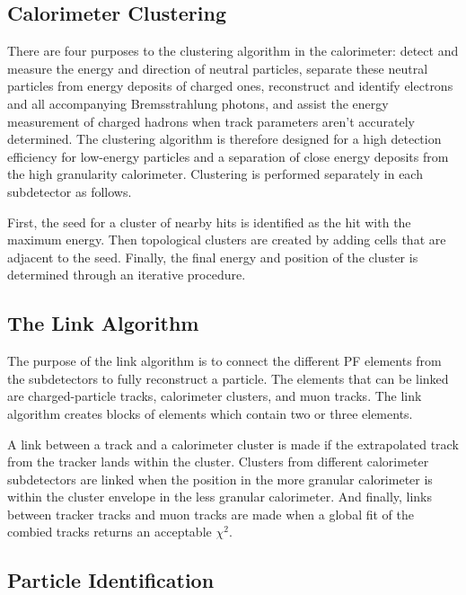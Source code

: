 \subsection{Calorimeter Clustering}

There are four purposes to the clustering algorithm in the calorimeter: detect and measure the energy and direction of neutral particles, separate these neutral particles from energy deposits of charged ones, reconstruct and identify electrons and all accompanying Bremsstrahlung photons, and assist the energy measurement of charged hadrons when track parameters aren’t accurately determined. The clustering algorithm is therefore designed for a high detection efficiency for low-energy particles and a separation of close energy deposits from the high granularity calorimeter. Clustering is performed separately in each subdetector as follows.

First, the seed for a cluster of nearby hits is identified as the hit with the maximum energy. Then topological clusters are created by adding cells that are adjacent to the seed. Finally, the final energy and position of the cluster is determined through an iterative procedure. 

\subsection{The Link Algorithm}

The purpose of the link algorithm is to connect the different PF elements from the subdetectors to fully reconstruct a particle. The elements that can be linked are charged-particle tracks, calorimeter clusters, and muon tracks. The link algorithm creates blocks of elements which contain two or three elements. 

A link between a track and a calorimeter cluster is made if the extrapolated track from the tracker lands within the cluster. Clusters from different calorimeter subdetectors are linked when the position in the more granular calorimeter is within the cluster envelope in the less granular calorimeter. And finally, links between tracker tracks and muon tracks are made when a global fit of the combied tracks returns an acceptable $\chi^{2}$. 

\subsection{Particle Identification}

